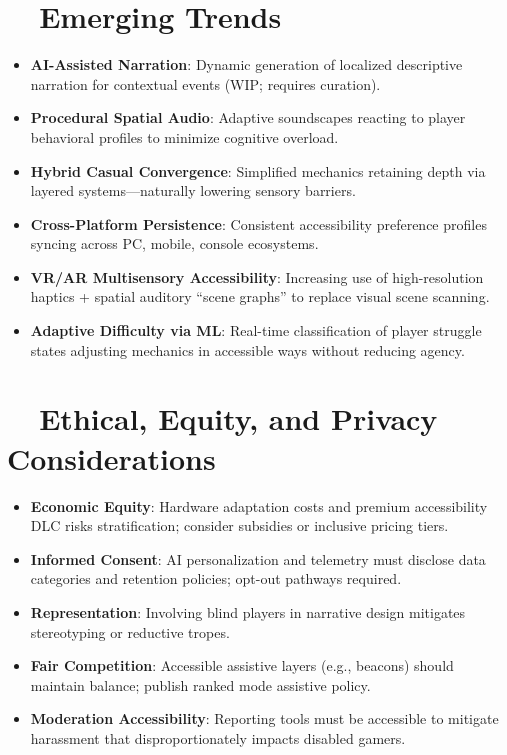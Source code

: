 \section{~~Emerging Trends}
\label{sec:gaming-emerging-trends}
\begin{itemize}
	\item \textbf{AI-Assisted Narration}: Dynamic generation of localized descriptive narration for contextual events (WIP; requires curation)\supercite{SlavnaStudio2025}.
	\item \textbf{Procedural Spatial Audio}: Adaptive soundscapes reacting to player behavioral profiles to minimize cognitive overload.
	\item \textbf{Hybrid Casual Convergence}: Simplified mechanics retaining depth via layered systems—naturally lowering sensory barriers\supercite{SegwiseTrends2025}.
	\item \textbf{Cross-Platform Persistence}: Consistent accessibility preference profiles syncing across PC, mobile, console ecosystems\supercite{SlavnaStudio2025}.
	\item \textbf{VR/AR Multisensory Accessibility}: Increasing use of high-resolution haptics + spatial auditory “scene graphs” to replace visual scene scanning\supercite{SlavnaStudio2025}.
	\item \textbf{Adaptive Difficulty via ML}: Real-time classification of player struggle states adjusting mechanics in accessible ways without reducing agency.
\end{itemize}

\section{~~Ethical, Equity, and Privacy Considerations}
\label{sec:gaming-ethics}
\begin{itemize}
	\item \textbf{Economic Equity}: Hardware adaptation costs and premium accessibility DLC risks stratification; consider subsidies or inclusive pricing tiers\supercite{ScopeGamingReport}.
	\item \textbf{Informed Consent}: AI personalization and telemetry must disclose data categories and retention policies; opt-out pathways required.
	\item \textbf{Representation}: Involving blind players in narrative design mitigates stereotyping or reductive tropes\supercite{ResearchGateInclusiveGames}.
	\item \textbf{Fair Competition}: Accessible assistive layers (e.g.,  beacons) should maintain balance; publish ranked mode assistive policy.
	\item \textbf{Moderation Accessibility}: Reporting tools must be accessible to mitigate harassment that disproportionately impacts disabled gamers\supercite{ScopeGamingReport}.
\end{itemize}

